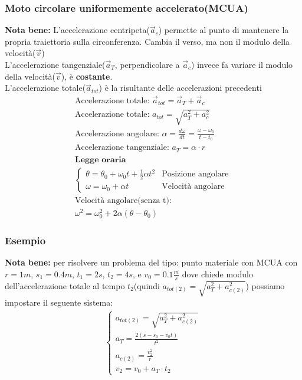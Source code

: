 \subsubsection{Moto circolare uniformemente accelerato(MCUA)}
\textbf{Nota bene: } L'accelerazione centripeta($\vec{a}_c$) permette al punto di mantenere la propria traiettoria sulla circonferenza. Cambia il verso, ma non il modulo della velocità($\vec{v}$) \\
L'accelerazione tangenziale($\vec{a}_T$, perpendicolare a $\vec{a}_c$) invece fa variare il modulo della velocità($\vec{v}$), è \textbf{costante}. \\
L'accelerazione totale($\vec{a}_{tot}$) è la risultante delle accelerazioni precedenti \\
\begin{gather*}
\text{Accelerazione totale: } \vec{a}_{tot} = \vec{a}_T + \vec{a}_c \\
\text{Accelerazione totale: } a_{tot} = \sqrt{a_T^2 + a_c^2} \\
\text{Accelerazione angolare: } \alpha = \frac{d \omega}{d t} = \frac{\omega - \omega_0}{t - t_0} \\
\text{Accelerazione tangenziale: } a_T = \alpha \cdot r \\
\textbf{Legge oraria} \\
\begin{cases}
    \theta = \theta_0 + \omega_0 t + \frac{1}{2} \alpha t^2 & \text{Posizione angolare} \\
    \omega = \omega_0 + \alpha t & \text{Velocità angolare}
\end{cases} \\
\text{Velocità angolare(senza t): } \\ \omega^2 = \omega_0^2 + 2 \alpha(\theta - \theta_0)
\end{gather*}
\subsubsection{Esempio}
\textbf{Nota bene: } per risolvere un problema del tipo: punto materiale con MCUA con $r = 1m$, $s_1 = 0.4m$, $t_1 = 2s$, $t_2 = 4s$, e $v_0 = 0.1 \frac{m}{s}$ dove chiede modulo dell'accelerazione totale al tempo $t_2$(quindi $a_{tot(2)} = \sqrt{a_T^2 + a_{c(2)}^2}$) possiamo impostare il seguente sistema:
\begin{gather*}
    \begin{cases}
        a_{tot(2)} = \sqrt{a_T^2 + a_{c(2)}^2} \\
        a_T = \frac{2(s - s_0 - v_0 t)}{t^2} \\
        a_{c(2)} = \frac{v_2^2}{r} \\ 
        v_{2} = v_0 + a_T \cdot t_2
    \end{cases}
\end{gather*}